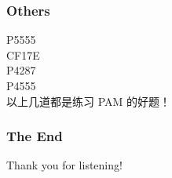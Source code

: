\documentclass{beamer}
\begin{document}
\begin{CJK}{UTF8}{gbsn}
\begin{frame}
	\end{frame}

	\begin{frame}
		\frametitle{Others}
		P5555\\
		CF17E\\
		P4287\\
		P4555\\
		以上几道都是练习 PAM 的好题！
	\end{frame}

	\begin{frame}
		\frametitle{The End}
		Thank you for listening!
	\end{frame}
	
\end{CJK}
\end{document}
